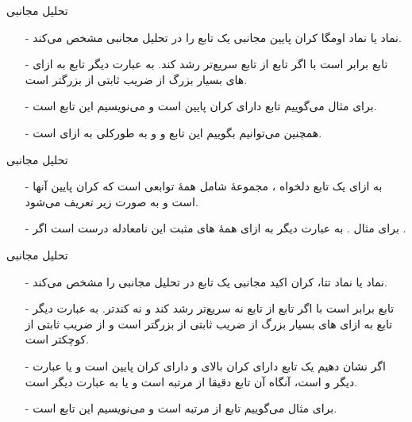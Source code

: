 \begin{frame}{‌تحلیل مجانبی}
\begin{itemize}\itemr
\item[-]
نماد
\m{\Omega}
یا نماد اومگا
کران پایین مجانبی
یک تابع را در تحلیل مجانبی مشخص می‌کند.
\item[-]
 تابع
برابر است با 
اگر تابع
از تابع
 سریع‌تر رشد کند.
 به عبارت دیگر تابع
  به ازای 
های بسیار بزرگ از ضریب ثابتی از 
بزرگتر است.
\item[-]
برای مثال می‌گوییم تابع
دارای کران پایین
است و می‌نویسیم این تابع
است.
\item[-]
همچنین می‌توانیم بگوییم این تابع
و
و به طور‌کلی
به ازای
است.
\end{itemize}
\end{frame}



\begin{frame}{‌تحلیل مجانبی}
\begin{itemize}\itemr
\item[-]
به ازای یک تابع دلخواه
، مجموعهٔ
شامل همهٔ توابعی است که کران پایین آنها
است و به صورت زیر تعریف می‌شود.
\begin{flushleft}
\end{flushleft}
\item[-]
برای مثال
. به عبارت دیگر
به ازای همهٔ
های مثبت این نامعادله درست است اگر
 .
\end{itemize}
\end{frame}


\begin{frame}{‌تحلیل مجانبی}
\begin{itemize}\itemr
\item[-]
نماد
\m{\Theta}
یا نماد تتا،
کران اکید مجانبی
یک تابع در تحلیل مجانبی را مشخص می‌کند.
\item[-]
 تابع
برابر است با 
اگر تابع
از تابع
نه سریع‌تر رشد کند و نه کندتر.
 به عبارت دیگر تابع
  به ازای 
های بسیار بزرگ
از ضریب ثابتی از 
بزرگتر است
و
از ضریب ثابتی از 
کوچکتر است.
\item[-]
اگر نشان دهیم یک تابع دارای کران بالای
و دارای کران پایین
است و یا عبارت دیگر
و
است، آنگاه آن تابع دقیقا از مرتبه
است و یا به عبارت دیگر
است.
\item[-]
برای مثال می‌گوییم تابع
از مرتبه
است و می‌نویسیم این تابع
است.
\end{itemize}
\end{frame}



